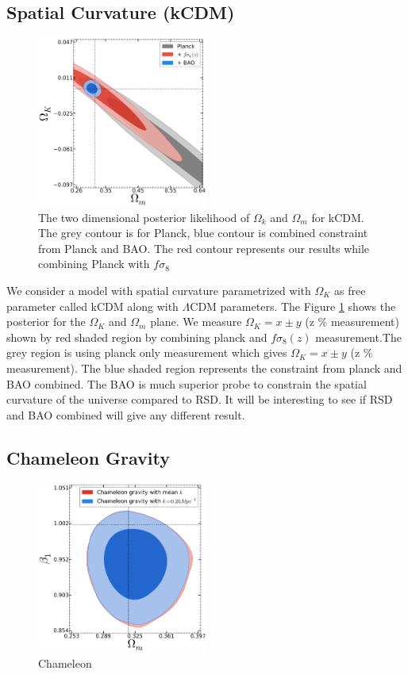 \subsection{Spatial Curvature (kCDM)}
\begin{figure}
\includegraphics[width=0.5\textwidth]{plots/Like-2D/kCDM-omegam-omegak_2D.png}
\caption{The two dimensional posterior likelihood of $\Omega_k$ and $\Omega_m$  for kCDM. The grey contour is for Planck, blue contour is combined constraint from Planck and BAO. The red contour represents  our results while combining Planck with $f\sigma_8$}
\label{fig:kCDM}
\end{figure}

We consider a model with spatial curvature parametrized with $\Omega_K$ as free parameter called kCDM along with $\Lambda$CDM parameters. The Figure \ref{fig:kCDM} shows the posterior for the $\Omega_K$ and $\Omega_m$ plane. We measure $\Omega_K= x \pm y$ (z \% measurement) shown by red shaded region by combining planck and $f\sigma_8(z)$ measurement.The grey region is using planck only measurement which gives $\Omega_K= x \pm y$ (z \% measurement). The blue shaded region represents the constraint from planck and BAO combined. The BAO is much superior probe to constrain the spatial curvature of the universe compared to RSD. It will be interesting to see if RSD and BAO combined will give any different result.


\subsection{Chameleon Gravity}
\begin{figure}
    \begin{center}        
        \includegraphics[width=0.5\textwidth]{plots/Like-2D/ChamB1-omegam-B1_2D.png}
     \end{center}
     \caption{Chameleon}
     \label{fig:Chambeta}
\end{figure}

